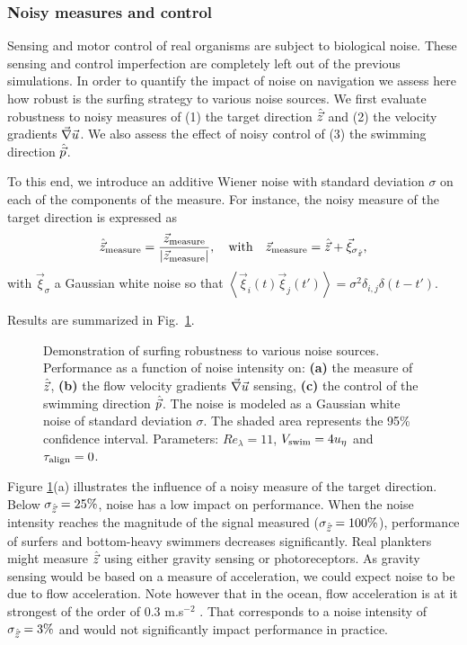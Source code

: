 \subsubsection{Noisy measures and control}\label{sec:noisy_measure_and_control}

Sensing and motor control of real organisms are subject to biological noise.
These sensing and control imperfection are completely left out of the previous simulations.
In order to quantify the impact of noise on navigation we assess here how robust is the surfing strategy to various noise sources. 
We first evaluate robustness to noisy measures of (1) the target direction $\hat{\vec{z}}$ and (2) the velocity gradients $\vec{\nabla} \vec{u}$.
We also assess the effect of noisy control of (3) the swimming direction $\hat{\vec{p}}$.

To this end, we introduce an additive Wiener noise with standard deviation $\sigma$ on each of the components of the measure.
For instance, the noisy measure of the target direction is expressed as
\begin{equation}
	\stepcounter{equation}
	\label{eq:noise}
	\Direction_{\textrm{measure}} = \frac{\DirectionNN_{\textrm{measure}}}{\norm{\DirectionNN_{\textrm{measure}}}}, \quad \text{with} \quad \DirectionNN_{\textrm{measure}} = \Direction + \vec{\xi}_{\sigma_{\Direction}} \text{,}
\end{equation}
with $\vec{\xi}_{\sigma}$ a Gaussian white noise so that $\left\langle \vec{\xi}_i(t)\vec{\xi}_j(t') \right\rangle = \sigma^2 \delta_{i,j} \delta(t - t')$.

Results are summarized in Fig.~\ref{fig:surfing_noise}.
\begin{figure}%
	\centering
	
	\caption[Demonstration of surfing robustness to various noise sources.]{
		Demonstration of surfing robustness to various noise sources.
		Performance as a function of noise intensity on:
		\textbf{(a)} the measure of $\hat{\vec{z}}$,
		\textbf{(b)} the flow velocity gradients $\vec{\nabla} \vec{u}$ sensing,
		\textbf{(c)} the control of the swimming direction $\hat{\vec{p}}$.
		The noise is modeled as a Gaussian white noise of standard deviation $\sigma$.
		The shaded area represents the 95\% confidence interval.
		Parameters: $\mathit{Re}_{\lambda} = 11$, $V_{\mathrm{swim}} = 4 u_{\eta}$ and $\tau_{\mathrm{align}} = 0$.
	}
	\label{fig:surfing_noise}
\end{figure}
Figure \ref{fig:surfing_noise}(a) illustrates the influence of a noisy measure of the target direction. 
Below $\sigma_{\hat{\vec{z}}} = 25\%$, noise has a low impact on performance. 
When the noise intensity reaches the magnitude of the signal measured ($\sigma_{\hat{\vec{z}}} = 100\%$), performance of surfers and bottom-heavy swimmers decreases significantly.
Real plankters might measure $\hat{\vec{z}}$ using either gravity sensing or photoreceptors.
As gravity sensing would be based on a measure of acceleration, we could expect noise to be due to flow acceleration.
Note however that in the ocean, flow acceleration is at it strongest of the order of $0.3$ m.s$^{-2}$ \citep{fuchs2016seascape}. 
That corresponds to a noise intensity of $\sigma_{\hat{\vec{z}}} = 3\%$ and would not significantly impact performance in practice.

